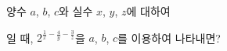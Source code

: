 양수 $a$, $b$, $c$와 실수 $x$, $y$, $z$에 대하여 \par\smallskip{}\par\smallskip\noindent 일 때, $2^{\frac{1}{x}-\frac{4}{y}-\frac{3}{z}}$을 $a$, $b$, $c$를 이용하여 나타내면?
